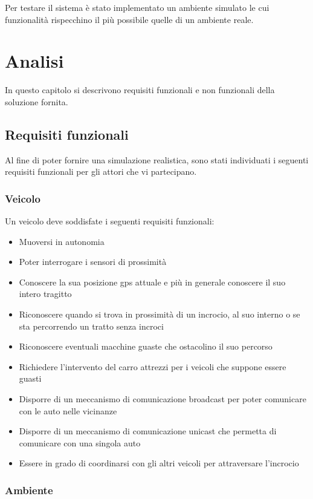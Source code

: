 \documentclass{memoir}
\begin{document}
Per testare il sistema è stato implementato un ambiente simulato le cui
funzionalità rispecchino il più possibile quelle di un ambiente reale.

\chapter{Analisi}\label{ch:analysis}
In questo capitolo si descrivono requisiti funzionali e non funzionali della
soluzione fornita.

\section{Requisiti funzionali}

Al fine di poter fornire una simulazione realistica, sono stati individuati i
seguenti requisiti funzionali per gli attori che vi partecipano.

\subsection{Veicolo}

Un veicolo deve soddisfate i seguenti requisiti funzionali:
\begin{itemize}
\item Muoversi in autonomia
\item Poter interrogare i sensori di prossimità
\item Conoscere la sua posizione gps attuale e più in generale conoscere il suo
  intero tragitto
\item Riconoscere quando si trova in prossimità di un incrocio, al suo interno o
  se sta percorrendo un tratto senza incroci
\item Riconoscere eventuali macchine guaste che ostacolino il suo percorso
\item Richiedere l'intervento del carro attrezzi per i veicoli che suppone
  essere guasti
\item Disporre di un meccanismo di comunicazione broadcast per poter comunicare
  con le auto nelle vicinanze
\item Disporre di un meccanismo di comunicazione unicast che permetta di
  comunicare con una singola auto
\item Essere in grado di coordinarsi con gli altri veicoli per attraversare
  l'incrocio
\end{itemize}

\subsection{Ambiente}
\end{document}
